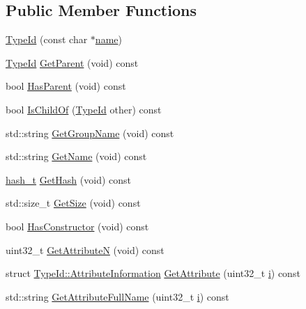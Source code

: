 \subsection*{Public Member Functions}
\begin{DoxyCompactItemize}
\item 
\hyperlink{classns3_1_1TypeId_afe8fa6bf1936d3ff19395f495bb0da61}{Type\+Id} (const char $\ast$\hyperlink{generate__test__data__lte__spectrum__model_8m_ab74e6bf80237ddc4109968cedc58c151}{name})
\item 
\hyperlink{classns3_1_1TypeId}{Type\+Id} \hyperlink{classns3_1_1TypeId_ac51f28398d2ef1f9a7790047c43dd22c}{Get\+Parent} (void) const 
\item 
bool \hyperlink{classns3_1_1TypeId_ab99027609ac10e4da99a8c2b978f60ac}{Has\+Parent} (void) const 
\item 
bool \hyperlink{classns3_1_1TypeId_ac32d55635e63dafc8c0e742dd6030f62}{Is\+Child\+Of} (\hyperlink{classns3_1_1TypeId}{Type\+Id} other) const 
\item 
std\+::string \hyperlink{classns3_1_1TypeId_a836b52efb8606b114b0f7b6b1c95447b}{Get\+Group\+Name} (void) const 
\item 
std\+::string \hyperlink{classns3_1_1TypeId_aa3c41c79ae428b3cb396a9c6bb3ef314}{Get\+Name} (void) const 
\item 
\hyperlink{classns3_1_1TypeId_ab3fc1475c4a0c2cfb35b976dbd609057}{hash\+\_\+t} \hyperlink{classns3_1_1TypeId_a0ef137a352a374aa1ecaaace20a091d2}{Get\+Hash} (void) const 
\item 
std\+::size\+\_\+t \hyperlink{classns3_1_1TypeId_aeb3197b459f03b750d2533c8104a930a}{Get\+Size} (void) const 
\item 
bool \hyperlink{classns3_1_1TypeId_a8141b06af599cd43c9bd60aede0abf93}{Has\+Constructor} (void) const 
\item 
uint32\+\_\+t \hyperlink{classns3_1_1TypeId_a679c4713f613126a51eb400b345302cb}{Get\+AttributeN} (void) const 
\item 
struct \hyperlink{structns3_1_1TypeId_1_1AttributeInformation}{Type\+Id\+::\+Attribute\+Information} \hyperlink{classns3_1_1TypeId_aa1b746e64e606f94cbedda7cf89788c2}{Get\+Attribute} (uint32\+\_\+t \hyperlink{lte__uplink__power__control_8m_a6f6ccfcf58b31cb6412107d9d5281426}{i}) const 
\item 
std\+::string \hyperlink{classns3_1_1TypeId_a1da5483f43630ea65952099fc39944a2}{Get\+Attribute\+Full\+Name} (uint32\+\_\+t \hyperlink{lte__uplink__power__control_8m_a6f6ccfcf58b31cb6412107d9d5281426}{i}) const 
\item 

\end{DoxyCompactItemize}

